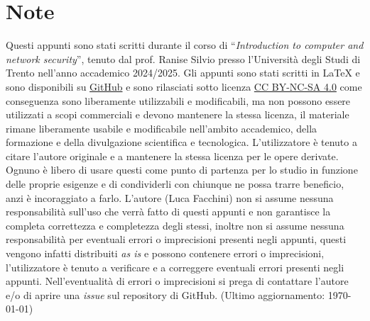\vfill
{\footnotesize
    \footnotesize\section*{Note}
    Questi appunti sono stati scritti durante il corso di ``\textit{Introduction to computer and network security}'', tenuto dal prof. Ranise Silvio presso l'Università degli Studi di Trento nell'anno accademico 2024/2025. Gli appunti sono stati scritti in \LaTeX{} e sono disponibili su \href{https://github.com/lucafano04/appuntisecondoanno}{GitHub} e sono rilasciati sotto licenza \href{https://creativecommons.org/licenses/by-nc-sa/4.0/}{CC BY-NC-SA 4.0} come conseguenza sono liberamente utilizzabili e modificabili, ma non possono essere utilizzati a scopi commerciali e devono mantenere la stessa licenza, il materiale rimane liberamente usabile e modificabile nell'ambito accademico, della formazione e della divulgazione scientifica e tecnologica. L'utilizzatore è tenuto a citare l'autore originale e a mantenere la stessa licenza per le opere derivate. Ognuno è libero di usare questi come punto di partenza per lo studio in funzione delle proprie esigenze e di condividerli con chiunque ne possa trarre beneficio, anzi è incoraggiato a farlo.
    L'autore (Luca Facchini) non si assume nessuna responsabilità sull'uso che verrà fatto di questi appunti e non garantisce la completa correttezza e completezza degli stessi, inoltre non si assume nessuna responsabilità per eventuali errori o imprecisioni presenti negli appunti, questi vengono infatti distribuiti \textit{as is} e possono contenere errori o imprecisioni, l'utilizzatore è tenuto a verificare e a correggere eventuali errori presenti negli appunti. Nell'eventualità di errori o imprecisioni si prega di contattare l'autore e/o di aprire una \textit{issue} sul repository di GitHub. (Ultimo aggiornamento: \today)
}